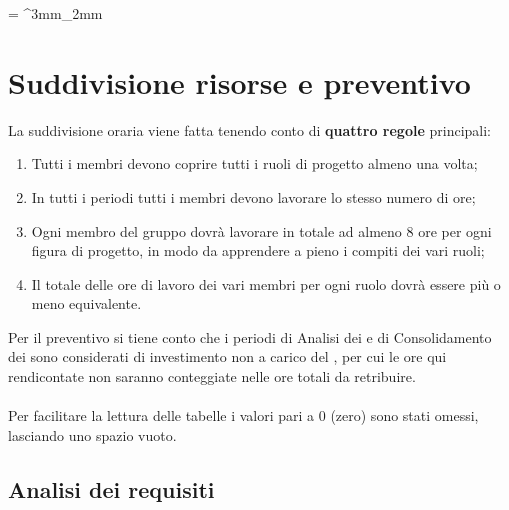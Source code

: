 \documentclass[PianoDiProgetto.tex]{subfiles}
\begin{document}
	
\tabulinesep = ^3mm_2mm

\chapter{Suddivisione risorse e preventivo}
La suddivisione oraria viene fatta tenendo conto di \textbf{quattro regole} principali:
\begin{enumerate}
	\item Tutti i membri devono coprire tutti i ruoli di progetto almeno una volta;
	\item In tutti i periodi tutti i membri devono lavorare lo stesso numero di ore;
	\item Ogni membro del gruppo dovrà lavorare in totale ad almeno 8 ore per ogni figura di progetto, in modo da apprendere a pieno i compiti dei vari ruoli;
	\item Il totale delle ore di lavoro dei vari membri per ogni ruolo dovrà essere più o meno equivalente.
\end{enumerate}
Per il preventivo si tiene conto che i periodi di Analisi dei  e di Consolidamento dei  sono considerati di investimento non a carico del , per cui le ore qui rendicontate non saranno conteggiate nelle ore totali da retribuire.\\\\
Per facilitare la lettura delle tabelle i valori pari a 0 (zero) sono stati omessi, lasciando uno spazio vuoto.
\newpage
\section{Analisi dei requisiti}
\end{document}
